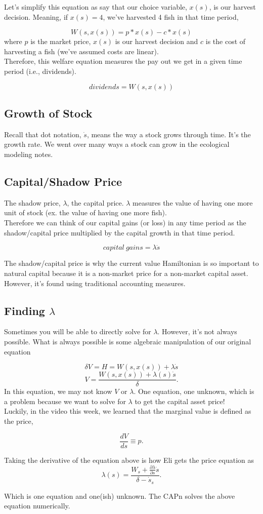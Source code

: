 \documentclass{article}
\begin{document}
Let's simplify this equation as say that our choice variable, $x(s)$, is our harvest decision. Meaning, if $x(s) = 4$, we've harvested 4 fish in that time period,  

$$W(s, x(s)) = p*x(s) - c * x(s) $$
where $p$ is the market price, $x(s)$ is our harvest decision and $c$ is the cost of harvesting a fish (we've assumed costs are linear). \\

Therefore, this welfare equation measures the pay out we get in a given time period (i.e., dividends). 

$$dividends = W(s, x(s))$$

\subsection{Growth of Stock}
Recall that dot notation, $\dot s$, means the way a stock grows through time. It's the growth rate. We went over many ways a stock can grow in the ecological modeling notes. \\

\subsection{Capital/Shadow Price}
The shadow price, $\lambda$, the capital price. $\lambda$ measures the value of having one more unit of stock (ex. the value of having one more fish). \\

Therefore we can think of our capital gains (or loss) in any time period as the shadow/capital price multiplied by the capital growth in that time period.

$$capital\ gains = \lambda \dot s $$

The shadow/capital price is why the current value Hamiltonian is so important to natural capital because it is a non-market price for a non-market capital asset. However, it's found using traditional accounting measures. 

\subsection{Finding $\lambda$}
Sometimes you will be able to directly solve for $\lambda$. However, it's not always possible. What is always possible is some algebraic manipulation of our original equation 

$$\delta V = H = W(s, x(s)) + \lambda \dot s$$
$$V = \frac{W(s, x(s)) + \lambda(s) \dot s  }{\delta}.$$
In this equation, we may not know $V$ or $\lambda$. One equation, one unknown, which is a problem because we want to solve for $\lambda$ to get the capital asset price! \\

Luckily, in the video this week, we learned that the marginal value is defined as the price, 

$$\frac{dV}{ds} \equiv p.$$ 

Taking the derivative of the equation above is how Eli gets the price equation as 
$$ \lambda(s) = \frac{W_s + \frac{\partial \lambda}{\partial s}\dot s }{\delta - \dot s_s}.$$

Which is one equation and one(ish) unknown. The CAPn solves the above equation numerically. 
\end{document}
